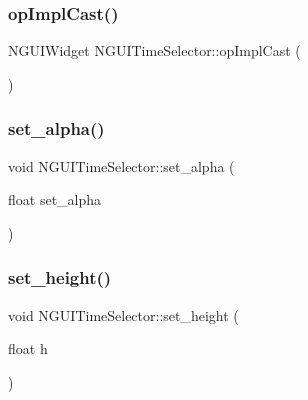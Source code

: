 \hypertarget{class_n_g_u_i_time_selector_a2a22c415ba23636323f965b788b97e25}{}\label{class_n_g_u_i_time_selector_a2a22c415ba23636323f965b788b97e25} 
\subsubsection{\texorpdfstring{op\+Impl\+Cast()}{opImplCast()}}
{\footnotesize\ttfamily N\+G\+U\+I\+Widget N\+G\+U\+I\+Time\+Selector\+::op\+Impl\+Cast (\begin{DoxyParamCaption}{ }\end{DoxyParamCaption})}

\hypertarget{class_n_g_u_i_time_selector_a467e79e56d02391d8f6a614148d7b070}{}\label{class_n_g_u_i_time_selector_a467e79e56d02391d8f6a614148d7b070} 
\subsubsection{\texorpdfstring{set\+\_\+alpha()}{set\_alpha()}}
{\footnotesize\ttfamily void N\+G\+U\+I\+Time\+Selector\+::set\+\_\+alpha (\begin{DoxyParamCaption}\item[{float}]{set\+\_\+alpha }\end{DoxyParamCaption})}

\hypertarget{class_n_g_u_i_time_selector_a977a98b74e0dd685ed8fc7d4fc5e48e0}{}\label{class_n_g_u_i_time_selector_a977a98b74e0dd685ed8fc7d4fc5e48e0} 
\subsubsection{\texorpdfstring{set\+\_\+height()}{set\_height()}}
{\footnotesize\ttfamily void N\+G\+U\+I\+Time\+Selector\+::set\+\_\+height (\begin{DoxyParamCaption}\item[{float}]{h }\end{DoxyParamCaption})}

\hypertarget{class_n_g_u_i_time_selector_a37ae0ae8f138e7fc0689eeb771dfaed9}{}\label{class_n_g_u_i_time_selector_a37ae0ae8f138e7fc0689eeb771dfaed9} 
